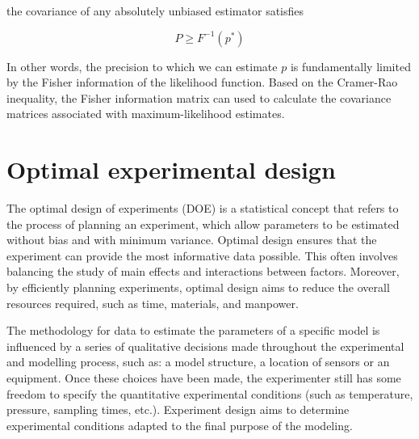 \documentclass[]{scrartcl}
\begin{document}
the covariance of any absolutely unbiased estimator satisfies

\begin{equation}
	P \geq F^{-1}(p^*)
\end{equation}

In other words, the precision to which we can estimate $p$ is fundamentally limited by the Fisher information of the likelihood function. Based on the Cramer-Rao inequality, the Fisher information matrix can used to calculate the covariance matrices associated with maximum-likelihood estimates.

\section{Optimal experimental design}

The optimal design of experiments (DOE) is a statistical concept that refers to the process of planning an experiment, which allow parameters to be estimated without bias and with minimum variance. Optimal design ensures that the experiment can provide the most informative data possible. This often involves balancing the study of main effects and interactions between factors. Moreover, by efficiently planning experiments, optimal design aims to reduce the overall resources required, such as time, materials, and manpower.

The methodology for data to estimate the parameters of a specific model is influenced by a series of qualitative decisions made throughout the experimental and modelling process, such as: a model structure, a location of sensors or an equipment. Once these choices have been made, the experimenter still has some freedom to specify the quantitative experimental conditions (such as temperature, pressure, sampling times, etc.). Experiment design aims to determine experimental conditions adapted to the final purpose of the modeling. 

\end{document}

